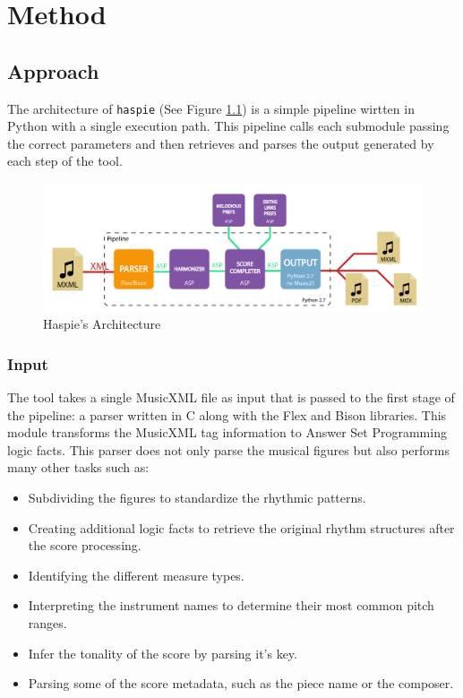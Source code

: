 \chapter{Method}
\label{chap:desarrollo}
\vspace{0.5cm}


\section{Approach}
\label{sec:metodology}

The architecture of \texttt{haspie} (See Figure \ref{fig:arquitectura_final}) is a simple pipeline wirtten in Python with a single execution path. This pipeline calls each submodule passing the correct parameters and then retrieves and parses the output generated by each step of the tool.

\begin{figure}[h]
	\centering
	\includegraphics[width=0.8\linewidth]{imagenes/arquitectura_final.pdf}
	\caption{Haspie's Architecture}
	\label{fig:arquitectura_final}
\end{figure}

\subsection{Input}
The tool takes a single MusicXML file as input that is passed to the first stage of the pipeline: a parser written in C along with the Flex and Bison libraries. This module transforms the MusicXML tag information to Answer Set Programming logic facts. This parser does not only parse the musical figures but also performs many other tasks such as:

\begin{itemize}
 	\item Subdividing the figures to standardize the rhythmic patterns.
 	\item Creating additional logic facts to retrieve the original rhythm structures after the score processing.
 	\item Identifying the different measure types.
 	\item Interpreting the instrument names to determine their most common pitch ranges.
 	\item Infer the tonality of the score by parsing it's key.
 	\item Parsing some of the score metadata, such as the piece name or the composer.
\end{itemize}


